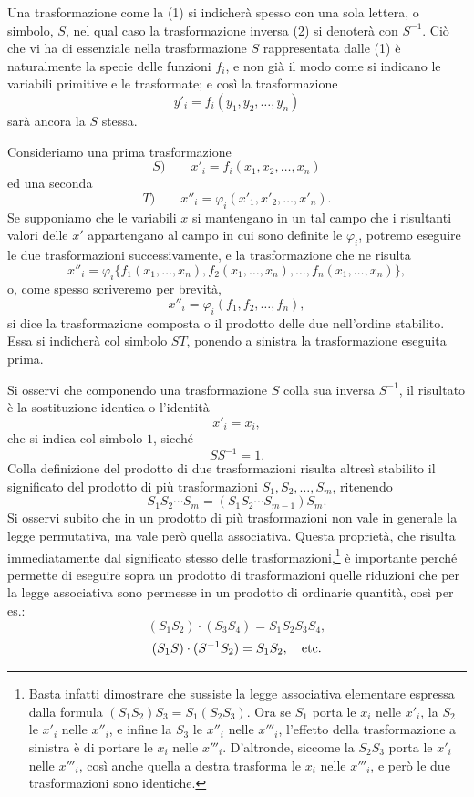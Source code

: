 \documentclass[11pt]{book}
\begin{document}
Una trasformazione come la (1) si indicherà spesso con una sola lettera, o simbolo, $S$, nel qual caso la trasformazione inversa (2) si denoterà con $S^{-1}$. Ciò che vi ha di essenziale nella trasformazione $S$ rappresentata dalle (1) è naturalmente la specie delle funzioni $f_i$, e non già il modo come si indicano le variabili primitive e le trasformate; e così la trasformazione
\[
 y'_i=f_i(y_1,y_2,\ldots,y_n)
\]
sarà ancora la $S$ stessa.

Consideriamo una prima trasformazione
\[
 S)\qquad x'_i=f_i(x_1,x_2,\ldots,x_n)
\]
ed una seconda
\[
 T)\qquad x''_i=\varphi_i(x'_1,x'_2,\ldots,x'_n).
\]
Se supponiamo che le variabili $x$ si mantengano in un tal campo che i risultanti valori delle $x'$ appartengano al campo in cui sono definite le $\varphi_i$, potremo eseguire le due trasformazioni successivamente, e la trasformazione che ne risulta
\[
 x''_i=\varphi_i\{f_1(x_1,\ldots,x_n),f_2(x_1,\ldots,x_n),\ldots,f_n(x_1,\ldots,x_n)\},
\]
o, come spesso scriveremo per brevità,
\[
 x''_i=\varphi_i(f_1,f_2,\ldots,f_n),
\]
si dice la trasformazione composta o il prodotto delle due nell'ordine stabilito. Essa si indicherà col simbolo $ST$, ponendo a sinistra la trasformazione eseguita prima.

Si osservi che componendo una trasformazione $S$ colla sua inversa $S^{-1}$, il risultato è la sostituzione identica o l'identità
\[
 x'_i=x_i,
\]
che si indica col simbolo $1$, sicché
\[
 SS^{-1}=1.
\]
Colla definizione del prodotto di due trasformazioni risulta altresì stabilito il significato del prodotto di più trasformazioni $S_1,S_2,\ldots,S_m$, ritenendo
\[
 S_1S_2\cdots S_m=(S_1S_2\cdots S_{m-1})S_m.
\]
Si osservi subito che in un prodotto di più trasformazioni non vale in generale la legge permutativa, ma vale però quella associativa. Questa proprietà, che risulta immediatamente dal significato stesso delle trasformazioni,\footnote{Basta infatti dimostrare che sussiste la legge associativa elementare espressa dalla formula $(S_1S_2)S_3=S_1(S_2S_3)$. Ora se $S_1$ porta le $x_i$ nelle $x'_i$, la $S_2$ le $x'_i$ nelle $x''_i$, e infine la $S_3$ le $x''_i$ nelle $x'''_i$, l'effetto della trasformazione a sinistra è di portare le $x_i$ nelle $x'''_i$. D'altronde, siccome la $S_2S_3$ porta le $x'_i$ nelle $x'''_i$, così anche quella a destra trasforma le $x_i$ nelle $x'''_i$, e però le due trasformazioni sono identiche.} è importante perché permette di eseguire sopra un prodotto di trasformazioni quelle riduzioni che per la legge associativa sono permesse in un prodotto di ordinarie quantità, così per es.:
\[
 (S_1S_2)\cdot(S_3S_4)=S_1S_2S_3S_4,
\]
\[
 (S_1S)\cdot(S^{-1}S_2)=S_1S_2,\quad\hbox{etc.}
\]
\end{document}

